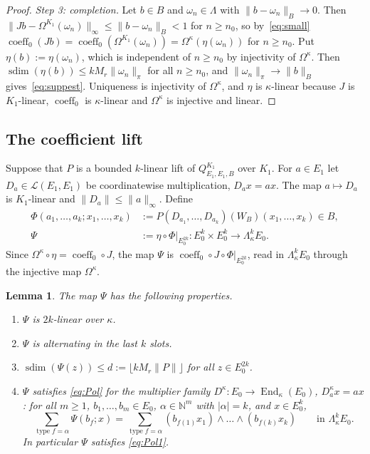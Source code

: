 \documentclass[11pt]{amsart}
\newtheorem{lemma}[theorem]{Lemma}
\theoremstyle{definition}
\theoremstyle{remark}
\numberwithin{equation}{section}
\newcommand{\N}{\mathbb{N}}
\newcommand{\cL}{\mathcal{L}}
\newcommand{\End}{\operatorname{End}}
\newcommand{\coeff}{\operatorname{coeff}}
\newcommand{\type}{\operatorname{type}}
\newcommand{\sdim}{\operatorname{sdim}}
\newcommand{\abs}[1]{\lvert #1\rvert}
\newcommand{\norm}[1]{\lVert #1\rVert}
\begin{document}
\begin{proof}
\emph{Step 3: completion.} Let $b\in B$ and $\omega_n\in\Lambda$ with $\norm{b-\omega_n}_B\to0$. Then
$\norm{Jb-\Omega^{K_1}(\omega_n)}_\infty\le\norm{b-\omega_n}_B<1$ for $n\ge n_0$, so by~\eqref{eq:small}
$\coeff_0(Jb)=\coeff_0(\Omega^{K_1}(\omega_n))=\Omega^\kappa(\eta(\omega_n))$ for $n\ge n_0$. Put $\eta(b):=\eta(\omega_n)$, which is independent of
$n\ge n_0$ by injectivity of $\Omega^\kappa$. Then $\sdim(\eta(b))\le kM_r\norm{\omega_n}_\pi$ for all $n\ge n_0$, and
$\norm{\omega_n}_\pi\to\norm b_B$ gives~\eqref{eq:suppest}. Uniqueness is injectivity of $\Omega^\kappa$, and $\eta$ is
$\kappa$\nobreakdash-linear because $J$ is $K_1$\nobreakdash-linear, $\coeff_0$ is $\kappa$\nobreakdash-linear and $\Omega^\kappa$ is injective and linear.
\end{proof}

\subsection{The coefficient lift}\label{ssec:Psi}
Suppose that $P$ is a bounded $k$\nobreakdash-linear lift of $Q^{K_1}_{E_1,E_1,B}$ over $K_1$. For $a\in E_1$ let
$D_a\in\cL(E_1,E_1)$ be coordinatewise multiplication, $D_ax=ax$. The map $a\mapsto D_a$ is $K_1$\nobreakdash-linear and
$\norm{D_a}\le\norm a_\infty$. Define
\begin{align*}
\Phi(a_1,\dots,a_k;x_1,\dots,x_k)&:=P(D_{a_1},\dots,D_{a_k})(W_B)(x_1,\dots,x_k)\in B,\\
\Psi&:=\eta\circ\Phi|_{E_0^{2k}}\colon E_0^k\times E_0^k\to\Lambda^k_\kappa E_0 .
\end{align*}
Since $\Omega^\kappa\circ\eta=\coeff_0\circ J$, the map $\Psi$ is $\coeff_0\circ J\circ\Phi|_{E_0^{2k}}$, read in $\Lambda^k_\kappa E_0$
through the injective map $\Omega^\kappa$.

\begin{lemma}\label{lem:Psi}
The map $\Psi$ has the following properties.
\begin{enumerate}
\item[($\Psi$1)] $\Psi$ is $2k$\nobreakdash-linear over $\kappa$.
\item[($\Psi$2)] $\Psi$ is alternating in the last $k$ slots.
\item[($\Psi$3)] $\sdim(\Psi(z))\le d:=\lfloor kM_r\norm P\rfloor$ for \emph{all} $z\in E_0^{2k}$.
\item[($\Psi$4)] $\Psi$ satisfies \eqref{eq:Pol} for the multiplier family $D^\kappa\colon E_0\to\End_\kappa(E_0)$,
$D^\kappa_ax=ax$: for all $m\ge1$, $b_1,\dots,b_m\in E_0$, $\alpha\in\N^m$ with $\abs\alpha=k$, and $x\in E_0^k$,
\[
\sum_{\type f=\alpha}\Psi(b_f;x)=\sum_{\type f=\alpha}(b_{f(1)}x_1)\wedge\dots\wedge(b_{f(k)}x_k)\qquad\text{in }\Lambda^k_\kappa E_0 .
\]
In particular $\Psi$ satisfies \eqref{eq:Pol1}.
\end{enumerate}
\end{lemma}
\end{document}
